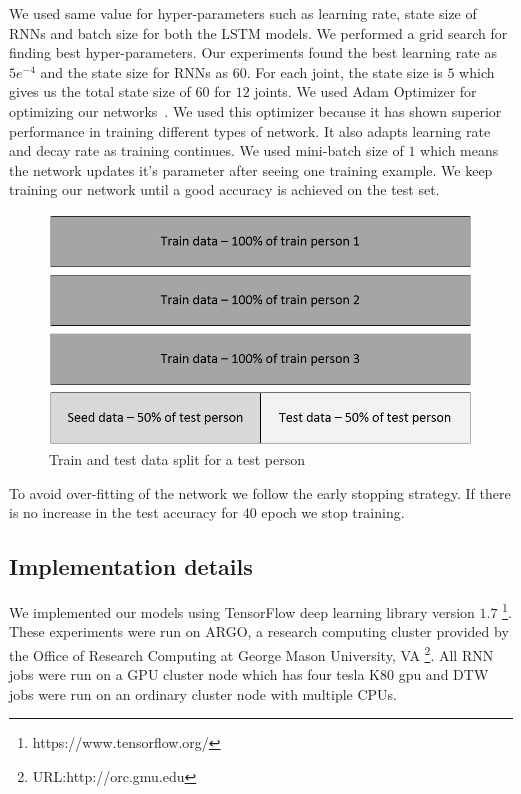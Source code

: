 \documentclass[10pt,twocolumn,letterpaper]{article}
\begin{document}
We used same value for hyper-parameters such as learning rate, state size of RNNs and batch size  for both the LSTM models. We performed 
a grid search for finding best hyper-parameters. Our experiments found the best learning rate as $5e^{-4}$ and the state size for RNNs as $60$. For each joint, the state size is $5$ which gives us the total 
state size of $60$ for $12$ joints. We used Adam Optimizer for optimizing our networks~\cite{DBLP:journals/corr/KingmaB14}. We used this 
optimizer because it has shown superior performance in training different types of network. It also adapts learning rate and 
decay rate as training continues. We used mini-batch size of $1$ which means the network updates it's parameter after seeing one training example. We keep training our network until a good accuracy is achieved on the test set.
\begin{figure}[h]
	\begin{center}
		\includegraphics[width=\linewidth, height=.2\textheight]{train_test_dat}
	\end{center}
	\caption{Train and test data split for a test person}
	\label{fig:train_test_dat}
\end{figure}
To avoid over-fitting of the network we follow the 
early stopping strategy. If there is no increase in the test accuracy for $40$ epoch  we  stop training. 

\subsection{Implementation details}

We implemented our models using TensorFlow deep learning library 
version $1.7$ \footnote{https://www.tensorflow.org/}. These experiments were run on ARGO, a research computing 
cluster provided by the Office of Research Computing at 
George Mason University, VA \footnote{URL:http://orc.gmu.edu}.
All RNN jobs were run on a GPU cluster node which has four tesla K80 gpu and DTW jobs were run on an ordinary cluster node with multiple CPUs.
\end{document}
